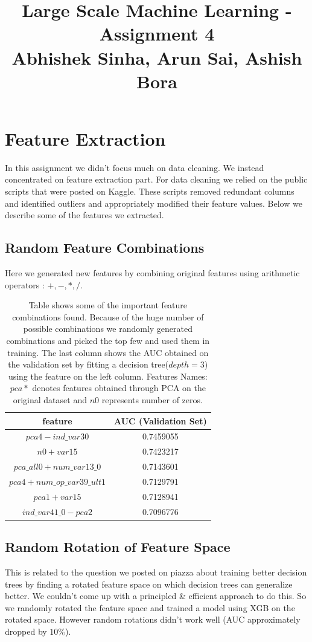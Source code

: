 \documentclass{article}
\begin{document}
\title{Large Scale Machine Learning - Assignment 4\\Abhishek Sinha, Arun Sai, Ashish Bora}
\maketitle
\section{Feature Extraction}
In this assignment we didn't focus much on data cleaning. We instead concentrated on feature extraction part. For data cleaning we relied on the public scripts that were posted on Kaggle. These scripts removed redundant columns and identified outliers and appropriately modified their feature values.
Below we describe some of the features we extracted. 
\subsection{Random Feature Combinations}
Here we generated new features by combining original features using arithmetic operators : $+, -, * , /$.
\begin{table}[h!]
\begin{center}
\begin{tabular}{ |c|c| } 
\hline
feature&AUC (Validation Set)\\ \hline
$pca4-ind\_var30$&0.7459055\\ \hline
$n0+var15$&0.7423217\\ \hline
$pca\_all0+num\_var13\_0$&0.7143601\\ \hline
$pca4+num\_op\_var39\_ult1$&0.7129791\\ \hline
$pca1+var15$&0.7128941\\ \hline
$ind\_var41\_0-pca2$&0.7096776\\ \hline
\end{tabular}
\end{center}
\caption{Table shows some of the important feature combinations found. Because of the huge number of possible combinations we randomly generated combinations and picked the top few and used them in training. The last column shows the AUC obtained on the validation set by fitting a decision tree($depth=3$) using the feature on the left column. Features Names: $pca*$ denotes features obtained through PCA on the original dataset and $n0$  represents number of zeros.}
\end{table}
\subsection{Random Rotation of Feature Space}
This is related to the question we posted on piazza about training better decision trees by finding a rotated feature space on which decision trees can generalize better. We couldn't come up with a principled \& efficient approach to do this. So we randomly rotated the feature space and trained a model using XGB on the rotated space. However random rotations didn't work well (AUC approximately dropped by $10\%$). 
\end{document}
